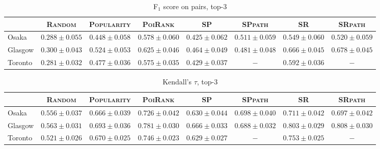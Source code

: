 \begin{table*}[!h]
\caption{F$_1$ score on pairs, top-3}
\centering
\small
\setlength{\tabcolsep}{4pt} %
\begin{tabular}{l|cc|cc|ccc} \hline
 & \textsc{Random} & \textsc{Popularity} & \textsc{PoiRank} & \textsc{SP} & \textsc{SPpath} & \textsc{SR} & \textsc{SRpath} \\ \hline
Osaka & $0.288\pm0.055$ & $0.448\pm0.058$ & $\mathbf{0.578\pm0.060}$ & $0.425\pm0.062$ & $0.511\pm0.059$ & $\mathit{0.549\pm0.060}$ & $0.520\pm0.059$ \\
Glasgow & $0.300\pm0.043$ & $0.524\pm0.053$ & $0.625\pm0.046$ & $0.464\pm0.049$ & $0.481\pm0.048$ & $\mathit{0.666\pm0.045}$ & $\mathbf{0.678\pm0.045}$ \\
Toronto & $0.281\pm0.032$ & $0.477\pm0.036$ & $\mathit{0.575\pm0.035}$ & $0.429\pm0.037$ & $-$ & $\mathbf{0.592\pm0.036}$ & $-$ \\
\hline
\end{tabular}
\end{table*}

\begin{table*}[!h]
\caption{Kendall's $\tau$, top-3}
\centering
\small
\setlength{\tabcolsep}{4pt} %
\begin{tabular}{l|cc|cc|ccc} \hline
 & \textsc{Random} & \textsc{Popularity} & \textsc{PoiRank} & \textsc{SP} & \textsc{SPpath} & \textsc{SR} & \textsc{SRpath} \\ \hline
Osaka & $0.556\pm0.037$ & $0.666\pm0.039$ & $\mathbf{0.726\pm0.042}$ & $0.630\pm0.044$ & $0.698\pm0.040$ & $\mathit{0.711\pm0.042}$ & $0.697\pm0.042$ \\
Glasgow & $0.563\pm0.031$ & $0.693\pm0.036$ & $0.781\pm0.030$ & $0.666\pm0.033$ & $0.688\pm0.032$ & $\mathit{0.803\pm0.029}$ & $\mathbf{0.808\pm0.030}$ \\
Toronto & $0.521\pm0.026$ & $0.670\pm0.025$ & $\mathit{0.746\pm0.023}$ & $0.629\pm0.027$ & $-$ & $\mathbf{0.753\pm0.025}$ & $-$ \\
\hline
\end{tabular}
\end{table*}

